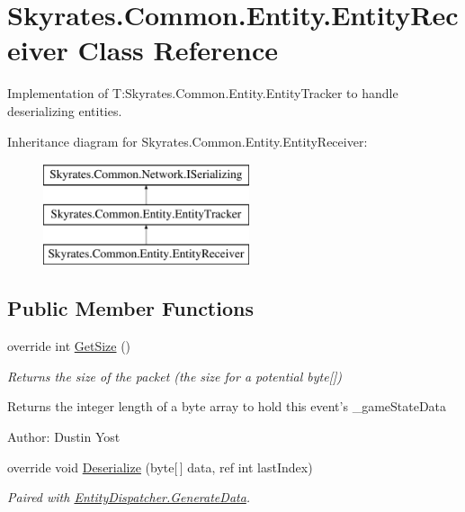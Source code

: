 \hypertarget{class_skyrates_1_1_common_1_1_entity_1_1_entity_receiver}{\section{Skyrates.\-Common.\-Entity.\-Entity\-Receiver Class Reference}
\label{class_skyrates_1_1_common_1_1_entity_1_1_entity_receiver}
}


Implementation of T\-:\-Skyrates.\-Common.\-Entity.\-Entity\-Tracker to handle deserializing entities.  


Inheritance diagram for Skyrates.\-Common.\-Entity.\-Entity\-Receiver\-:\begin{figure}[H]
\begin{center}
\leavevmode
\includegraphics[height=3.000000cm]{class_skyrates_1_1_common_1_1_entity_1_1_entity_receiver}
\end{center}
\end{figure}
\subsection*{Public Member Functions}
\begin{DoxyCompactItemize}
\item 
\hypertarget{class_skyrates_1_1_common_1_1_entity_1_1_entity_receiver_af1cfb5c70f163aca0fbd0c578ae1e713}{override int \hyperlink{class_skyrates_1_1_common_1_1_entity_1_1_entity_receiver_af1cfb5c70f163aca0fbd0c578ae1e713}{Get\-Size} ()}\label{class_skyrates_1_1_common_1_1_entity_1_1_entity_receiver_af1cfb5c70f163aca0fbd0c578ae1e713}

\begin{DoxyCompactList}\small\item\em Returns the size of the packet (the size for a potential byte\mbox{[}\mbox{]}) 

\begin{DoxyReturn}{Returns}
the integer length of a byte array to hold this event's \-\_\-game\-State\-Data 
\end{DoxyReturn}


Author\-: Dustin Yost  \end{DoxyCompactList}\item 
override void \hyperlink{class_skyrates_1_1_common_1_1_entity_1_1_entity_receiver_a9da0b7c3a8b9e1ed7d10be74ce80482b}{Deserialize} (byte\mbox{[}$\,$\mbox{]} data, ref int last\-Index)
\begin{DoxyCompactList}\small\item\em Paired with \hyperlink{class_skyrates_1_1_common_1_1_entity_1_1_entity_dispatcher_a3e3281a4c3b0890b1519562bee2610d6}{Entity\-Dispatcher.\-Generate\-Data}. \end{DoxyCompactList}\end{DoxyCompactItemize}
